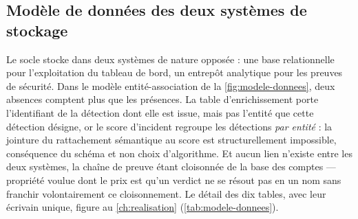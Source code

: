 \subsection{Modèle de données des deux systèmes de stockage}

Le socle stocke dans deux systèmes de nature opposée : une base relationnelle pour l'exploitation
du tableau de bord, un entrepôt analytique pour les preuves de sécurité. Dans le modèle
entité-association de la \cref{fig:modele-donnees}, deux absences comptent plus que les présences.
La table d'enrichissement porte l'identifiant de la détection dont elle est issue, mais pas
l'entité que cette détection désigne, or le score d'incident regroupe les détections \emph{par
entité} : la jointure du rattachement sémantique au score est structurellement impossible,
conséquence du schéma et non choix d'algorithme. Et aucun lien n'existe entre les deux systèmes,
la chaîne de preuve étant cloisonnée de la base des comptes --- propriété voulue dont le prix est
qu'un verdict ne se résout pas en un nom sans franchir volontairement ce cloisonnement. Le détail
des dix tables, avec leur écrivain unique, figure au \cref{ch:realisation}
(\cref{tab:modele-donnees}).

